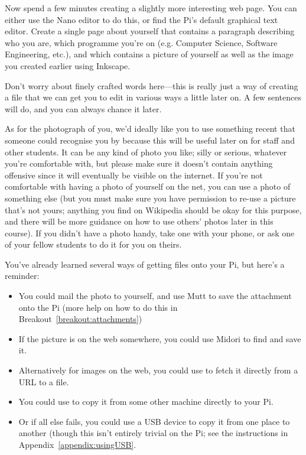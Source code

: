 Now spend a few minutes creating a slightly more interesting web page. You can either use the Nano editor to do this, or find the Pi's default graphical text editor. Create a single page about yourself that contains a paragraph describing who you are, which programme you're on (e.g. Computer Science, Software Engineering, etc.), and which contains a picture of yourself as well as the image you created earlier using Inkscape. 

Don't worry about finely crafted words here---this is really just a way of creating a file that we can get you to edit in various ways a little later on. A few sentences will do, and you can always chance it later. 

As for the photograph of you, we'd ideally like you to use something recent that someone could recognise you by because this will be useful later on for staff and other students. It can be any kind of photo you like; silly or serious, whatever you're comfortable with, but please make sure it doesn't contain anything offensive since it will eventually be visible on the internet. If you're not comfortable with having a photo of yourself on the net, you can use a photo of something else (but you must make sure you have permission to re-use a picture that's not yours; anything you find on Wikipedia should be okay for this purpose, and there will be more guidance on how to use others' photos later in this course). If you didn't have a photo handy, take one with your phone, or ask one of your fellow students to do it for you on theirs.

You've already learned several ways of getting files onto your Pi, but here's a reminder:
\begin{itemize}
\item You could mail the photo to yourself, and use Mutt to save the attachment onto the Pi (more help on how to do this in Breakout~\ref{breakout:attachments})
\item If the picture is on the web somewhere, you could use Midori to find and save it. 
\item Alternatively for images on the web, you could use  to fetch it directly from a URL to a file. 
\item You could use  to copy it from some other machine directly to your Pi. 
\item Or if all else fails, you could use a USB device to copy it from one place to another (though this isn't entirely trivial on the Pi; see the instructions in Appendix~\ref{appendix:usingUSB}.
\end{itemize}

